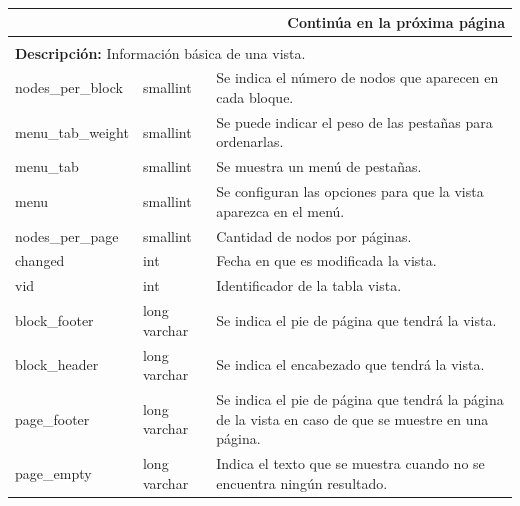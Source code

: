 \begin{center}
\begin{longtable}{|p{5.1cm}|p{3cm}|p{8.3cm}|}
\multicolumn{3}{|r|}{{Continúa en la próxima página}} \\ \hline
\endfoot
\endlastfoot

\hline

 \multicolumn{3}{|>{\columncolor[gray]{.9}}l|}{{\bf Nombre:} view\_view } \\ \hline

 \multicolumn{3}{|l|}{ {\bf Descripción:} Información básica de una vista.} \\ \hline

 nodes\_per\_block &  smallint &  Se indica el número de nodos que aparecen en cada bloque. \\ \hline

 menu\_tab\_weight &  smallint &  Se puede indicar el peso de las pestañas para ordenarlas. \\ \hline

 menu\_tab &  smallint &  Se muestra un menú de pestañas. \\ \hline

 menu &  smallint &  Se configuran las opciones para que la vista aparezca en el menú. \\ \hline

 nodes\_per\_page  &  smallint &  Cantidad de nodos por páginas. \\ \hline

 changed &  int &  Fecha en que es modificada la vista. \\ \hline

 vid &  int &  Identificador de la tabla vista. \\ \hline

 block\_footer &  long varchar &  Se indica el pie de página que tendrá la vista. \\ \hline

 block\_header &  long varchar &  Se indica el encabezado que tendrá la vista. \\ \hline

 page\_footer  &  long varchar &  Se indica el pie de página que tendrá la página de la vista en caso de que se muestre en una página. \\ \hline

  page\_empty  &  long varchar &  Indica el texto que se muestra cuando no se
encuentra ningún resultado. \\ \hline


\end{longtable}
\end{center}
